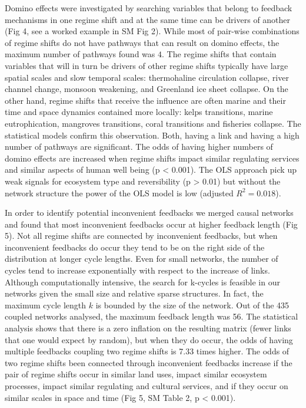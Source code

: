 \documentclass[9pt,]{article}
\begin{document}
Domino effects were investigated by searching variables that belong to
feedback mechanisms in one regime shift and at the same time can be
drivers of another (Fig 4, see a worked example in SM Fig 2). While most
of pair-wise combinations of regime shifts do not have pathways that can
result on domino effects, the maximum number of pathways found was
\(4\). The regime shifts that contain variables that will in turn be
drivers of other regime shifts typically have large spatial scales and
slow temporal scales: thermohaline circulation collapse, river channel
change, monsoon weakening, and Greenland ice sheet collapse. On the
other hand, regime shifts that receive the influence are often marine
and their time and space dynamics contained more locally: kelps
transitions, marine eutrophication, mangroves transitions, coral
transitions and fisheries collapse. The statistical models confirm this
observation. Both, having a link and having a high number of pathways
are significant. The odds of having higher numbers of domino effects are
increased when regime shifts impact similar regulating services and
similar aspects of human well being (p \textless{} 0.001). The OLS
approach pick up weak signals for ecosystem type and reversibility (p
\textgreater{} 0.01) but without the network structure the power of the
OLS model is low (adjusted \(R^2= 0.018\)).

In order to identify potential inconvenient feedbacks we merged causal
networks and found that most inconvenient feedbacks occur at higher
feedback length (Fig 5). Not all regime shifts are connected by
inconvenient feedbacks, but when inconvenient feedbacks do occur they
tend to be on the right side of the distribution at longer cycle
lengths. Even for small networks, the number of cycles tend to increase
exponentially with respect to the increase of links. Although
computationally intensive, the search for k-cycles is feasible in our
networks given the small size and relative sparse structures. In fact,
the maximum cycle length \(k\) is bounded by the size of the network.
Out of the 435 coupled networks analysed, the maximum feedback length
was 56. The statistical analysis shows that there is a zero inflation on
the resulting matrix (fewer links that one would expect by random), but
when they do occur, the odds of having multiple feedbacks coupling two
regime shifts is 7.33 times higher. The odds of two regime shifts been
connected through inconvenient feedbacks increase if the pair of regime
shifts occur in similar land uses, impact similar ecosystem processes,
impact similar regulating and cultural services, and if they occur on
similar scales in space and time (Fig 5, SM Table 2, p \textless{}
0.001).
\end{document}
